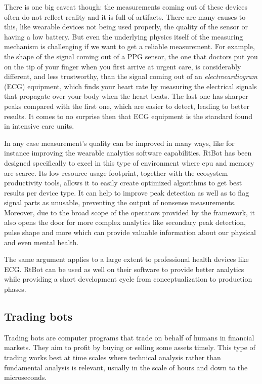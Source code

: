 \documentclass[preprint,1p,times]{elsarticle}
\begin{document}
There is one big caveat though: the measurements coming out of these devices often do not reflect reality 
and it is full of artifacts. There are many causes to this, like wearable devices not being used properly,
the quality of the sensor or having a low battery. But even the underlying physics itself of the measuring
mechanism is challenging if we want to get a reliable measurement. For example, the shape of the signal
coming out of a PPG sensor, the one that doctors put you on the tip of your finger when you first arrive
at urgent care, is considerably different, and less trustworthy,  than the signal coming out of an 
\textit{electrocardiogram} (ECG) equipment, which finds your heart rate by measuring the electrical signals that 
propagate over your body when the heart beats. The last one has sharper peaks compared with the first one, 
which are easier to detect, leading to better results. It comes to no surprise then that ECG equipment is 
the standard found in intensive care units.

In any case measurement's quality can be improved in many ways, like for instance improving the wearable 
analytics software capabilities. RtBot has been designed specifically to excel in this type of environment 
where cpu and memory are scarce. Its low resource usage footprint, together with the ecosystem productivity 
tools, allows it to easily create optimized algorithms to get best results per device type. It can help to 
improve peak detection as well as to flag signal parts as unusable, preventing the output of nonsense 
measurements. Moreover, due to the broad scope of the operators provided by the framework, it also opens 
the door for more complex analytics like secondary peak detection, pulse shape and more which can provide 
valuable information about our physical and even mental health.

The same argument applies to a large extent to professional health devices like ECG. RtBot can be used as 
well on their software to provide better analytics while providing a short development cycle from 
conceptualization to production phases.

\subsection{Trading bots}

Trading bots are computer programs that trade on behalf of humans in financial markets. They aim to profit by 
buying or selling some assets timely. This type of trading works best at time scales where technical analysis 
rather than fundamental analysis is relevant, usually in the scale of hours and down to the microseconds.
\end{document}
